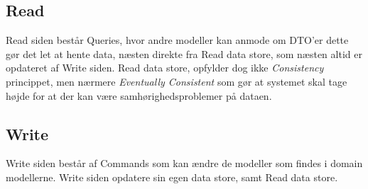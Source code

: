 \subsection{Read}

Read siden består Queries, hvor andre modeller kan anmode om DTO'er dette gør det let at hente data, næsten direkte fra Read data store, som næsten altid er opdateret af Write siden. Read data store, opfylder dog ikke \textit{Consistency} princippet, men nærmere \textit{Eventually Consistent} som gør at systemet skal tage højde for at der kan være samhørighedsproblemer på dataen. 
\subsection{Write}

Write siden består af Commands som kan ændre de modeller som findes i domain modellerne. Write siden opdatere sin egen data store, samt Read data store.
